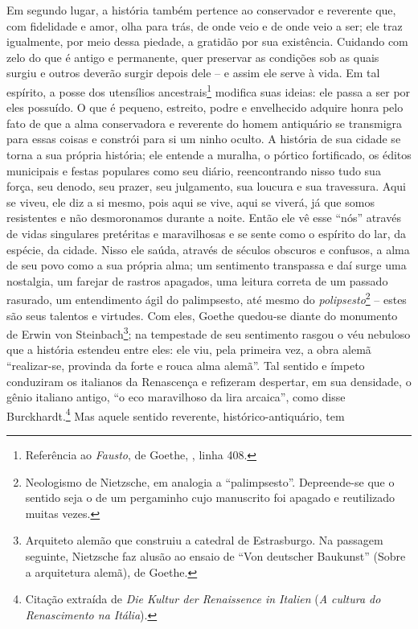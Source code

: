 Em segundo lugar, a história também pertence ao conservador e reverente que, 
com fidelidade e amor, olha para trás, de onde veio e de
onde veio a ser; ele traz igualmente, por meio dessa piedade, a gratidão
por sua existência. Cuidando com zelo do que é antigo e permanente, quer preservar
 as condições sob as quais surgiu e outros deverão
surgir depois dele -- e assim ele serve à vida. Em tal espírito, a posse
dos utensílios ancestrais\footnote{Referência ao \emph{Fausto}, de
  Goethe, , linha 408.} modifica suas ideias: ele passa a ser por eles
possuído. O que é pequeno, estreito, podre e envelhecido adquire honra
pelo fato de que a alma conservadora e reverente do homem antiquário se
transmigra para essas coisas e constrói para si um ninho oculto. A
história de sua cidade se torna a sua própria história; ele entende a
muralha, o pórtico fortificado, os éditos municipais e festas populares
como seu diário, reencontrando nisso tudo sua força, seu denodo, seu
prazer, seu julgamento, sua loucura e sua travessura. Aqui se viveu, ele
diz a si mesmo, pois aqui se vive, aqui se viverá, já que somos
resistentes e não desmoronamos durante a noite. Então ele vê esse
``nós'' através de vidas singulares pretéritas e maravilhosas e se sente
como o espírito do lar, da espécie, da cidade. Nisso ele saúda, através
de séculos obscuros e confusos, a alma de seu povo como a sua própria
alma; um sentimento transpassa e daí surge uma nostalgia, um farejar de
rastros apagados, uma leitura correta de um passado rasurado, um
entendimento ágil do palimpsesto, até mesmo do \emph{polipsesto}\footnote{Neologismo
  de Nietz\-sche, em analogia a ``palimpsesto''. Depreende-se que o
  sentido seja o de um pergaminho cujo manuscrito foi apagado e
  reutilizado muitas vezes.} -- estes são seus talentos e virtudes. Com
eles, Goethe quedou-se diante do monumento de Erwin von
Steinbach\footnote{Arquiteto alemão que construiu a catedral de
  Estrasburgo. Na passagem seguinte, Nietz\-sche faz alusão ao ensaio de
  ``Von deutscher Baukunst'' (Sobre a arquitetura alemã), de Goethe.};
na tempestade de seu sentimento rasgou o véu nebuloso que a história
estendeu entre eles: ele viu, pela primeira vez, a obra alemã
``realizar-se, provinda da forte e rouca alma alemã''. Tal sentido e
ímpeto conduziram os italianos da Renascença e refizeram despertar, em
sua densidade, o gênio italiano antigo, ``o eco maravilhoso da lira
arcaica'', como disse Burckhardt.\footnote{Citação extraída de \emph{Die
  Kultur der Renaissence in Italien} (\emph{A cultura do Renascimento na
  Itália}).} Mas aquele sentido reverente, histórico-antiquário, tem

